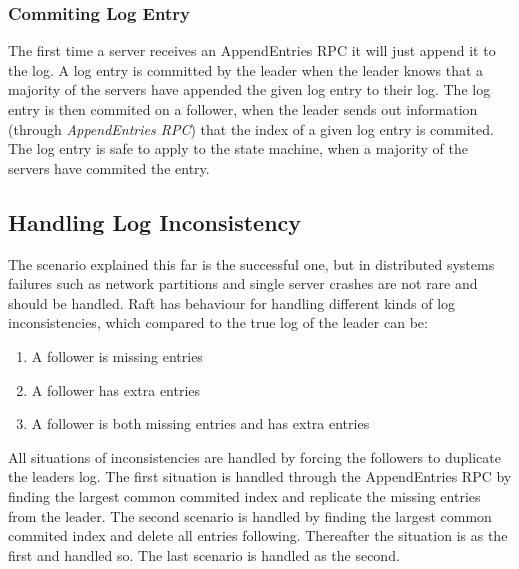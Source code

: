 
\subsubsection{Commiting Log Entry} %
\label{ssub:commiting_log_entry}

The first time a server receives an AppendEntries RPC it will just append it to the log. A log entry is committed by the leader when the leader knows that a majority of the servers have appended the given log entry to their log. The log entry is then commited on a follower, when the leader sends out information (through \emph{AppendEntries RPC}) that the index of a given log entry is commited. The log entry is safe to apply to the state machine, when a majority of the servers have commited the entry.


\subsection{Handling Log Inconsistency} %
\label{sub:handling_log_inconsistency}

The scenario explained this far is the successful one, but in distributed systems failures such as network partitions and single server crashes are not rare and should be handled. Raft has behaviour for handling different kinds of log inconsistencies, which compared to the true log of the leader can be:

\begin{enumerate}
  \item A follower is missing entries
  \item A follower has extra entries
  \item A follower is both missing entries and has extra entries
\end{enumerate}

All situations of inconsistencies are handled by forcing the followers to duplicate the leaders log. The first situation is handled through the AppendEntries RPC by finding the largest common commited index and replicate the missing entries from the leader. The second scenario is handled by finding the largest common commited index and delete all entries following. Thereafter the situation is as the first and handled so. The last scenario is handled as the second.


